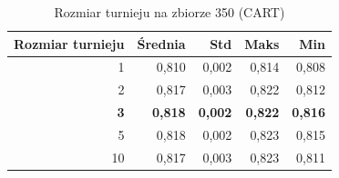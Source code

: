 \begin{table}[htbp]
\centering
\small
\setlength{\tabcolsep}{6pt}
\renewcommand{\arraystretch}{1.2}
\caption{Rozmiar turnieju na zbiorze 350 (CART)}
\label{tab:CART_tournament_size_350}
\begin{tabular}{r|r|r|r|r}
\toprule
Rozmiar turnieju & Średnia & Std & Maks & Min \\
\hline
1 & 0,810 & 0,002 & 0,814 & 0,808 \\
2 & 0,817 & 0,003 & 0,822 & 0,812 \\
\textbf{3} & \textbf{0,818} & \textbf{0,002} & \textbf{0,822} & \textbf{0,816} \\
5 & 0,818 & 0,002 & 0,823 & 0,815 \\
10 & 0,817 & 0,003 & 0,823 & 0,811 \\
\bottomrule
\end{tabular}
\end{table}